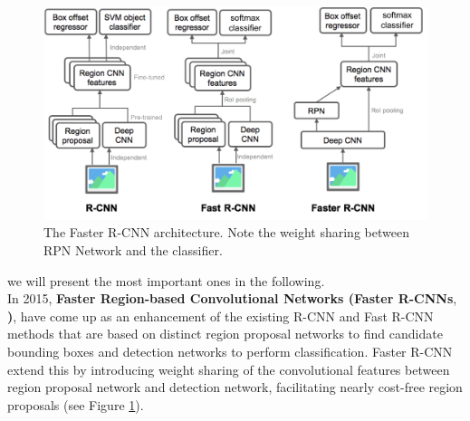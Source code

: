 \documentclass[a4paper]{article}
\begin{document}
\begin{figure}
\includegraphics[scale=0.18]{images/FRCN_architecture}
\caption{The Faster R-CNN architecture. Note the weight sharing between RPN Network and the classifier.}
\label{fig:rcnn-architectures}
\end{figure} we will present the most important ones in the following.\\ In 2015, \textbf{Faster Region-based Convolutional Networks (Faster R-CNNs}, \cite{DBLP:journals/corr/RenHG015}\textbf{)},  have come up as an enhancement  of the existing R-CNN and Fast R-CNN methods that are based on distinct region proposal networks to find candidate bounding boxes and detection networks to perform classification. Faster R-CNN extend this by introducing weight sharing of the convolutional features between region proposal network and detection network, facilitating nearly cost-free region proposals (see Figure \ref{fig:rcnn-architectures}). 
\end{document}
